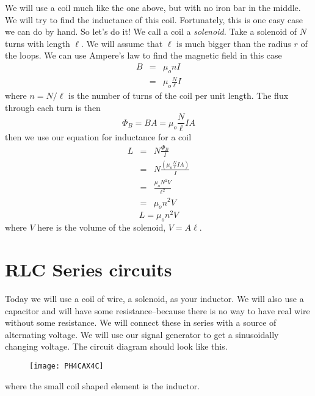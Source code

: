 We will use a coil much like the one above, but with no iron bar in the
middle. We will try to find the inductance of this coil. Fortunately, this
is one easy case we can do by hand. So let's do it! We call a coil a \emph{%
solenoid.} Take a solenoid of $N$ turns with length $\ell .$ We will assume
that $\ell $ is much bigger than the radius $r$ of the loops. We can use
Ampere's law to find the magnetic field in this case 
\begin{eqnarray*}
B &=&\mu _{o}nI \\
&=&\mu _{o}\frac{N}{\ell }I
\end{eqnarray*}%
where $n=N/\ell $ is the number of turns of the coil per unit length. The
flux through each turn is then 
\begin{equation*}
\Phi _{B}=BA=\mu _{o}\frac{N}{\ell }IA
\end{equation*}%
then we use our equation for inductance for a coil%
\begin{eqnarray*}
L &=&N\frac{\Phi _{B}}{I} \\
&=&N\frac{\left( \mu _{o}\frac{N}{\ell }IA\right) }{I} \\
&=&\frac{\mu _{o}N^{2}V}{\ell ^{2}} \\
&=&\mu _{o}n^{2}V
\end{eqnarray*}%
\begin{equation}
L=\mu _{o}n^{2}V  \label{Solenoid Inductance}
\end{equation}%
where $V$ here is the volume of the solenoid, $V=A\ell .$

\section{RLC Series circuits}

Today we will use a coil of wire, a solenoid, as your inductor. We will also
use a capacitor and will have some resistance--because there is no way to
have real wire without some resistance. We will connect these in series with
a source of alternating voltage. We will use our signal generator to get a
sinusoidally changing voltage. The circuit diagram should look like this.%
\begin{figure}[h!]
\texttt{[image: PH4CAX4C]}
\end{figure}%
where the small coil shaped element is the inductor.

